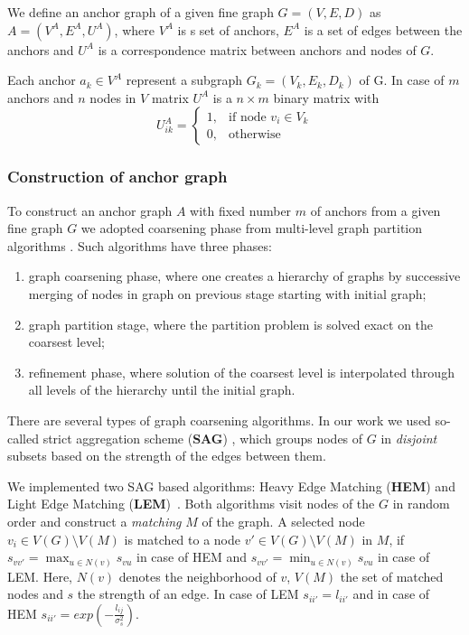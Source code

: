 \documentclass[
	fontsize=12pt,
	paper=a4,
	twoside=false,
	numbers=noenddot,
	plainheadsepline,
	toc=listof,
	toc=bibliography
]{scrartcl}
\begin{document}
We define an anchor graph of a given fine graph $G = (V,E,D)$ as $A = (V^A,E^A, U^A)$, where $V^A$ is s set of anchors, $E^{A}$ is a set of edges between the anchors and $U^{A}$ is a correspondence matrix between anchors and nodes of $G$.

Each anchor $a_k\in V^A$ represent a subgraph $G_k = (V_k,E_k, D_k)$ of G. In case of $m$ anchors and $n$ nodes in $V$  matrix $U^{A}$ is a $n\times m$ binary matrix with 
$$U^{A}_{ik} = \begin{cases} 1, & \mbox{if node } v_i\in V_k    \\
	                         0, & \mbox{otherwise} \end{cases} $$	 
	                                                 
\subsubsection{Construction of anchor graph}	                         
To construct an anchor graph $A$ with fixed number $m$ of anchors from a given fine graph $G$ we adopted coarsening phase from multi-level graph partition algorithms \cite{Chevalier09_GP, Safro2012_GC, Karypis95_GP, Hendrickson1995}.
Such algorithms have three phases: 
\begin{enumerate}
	\item graph coarsening phase, where one creates a hierarchy of graphs by successive merging of nodes in graph on previous stage starting with initial graph;
	\item graph partition stage, where the partition problem is solved exact on the coarsest level;
	\item refinement phase, where solution of the coarsest level is interpolated through all levels of the hierarchy until the initial graph.
\end{enumerate}
There are several types of graph coarsening algorithms. In our work we used so-called strict aggregation scheme (\textbf{SAG}) \cite{Chevalier09_GP}, which groups nodes of $G$ in \emph{disjoint} subsets based on the strength of the edges between them. 

We implemented two SAG based algorithms: Heavy Edge Matching (\textbf{HEM}) and Light Edge Matching (\textbf{LEM})~\cite{Chevalier09_GP}. Both algorithms visit nodes of the $G$ in random order and construct a \emph{matching} $M$ of the graph. A selected node $v_i\in V(G)\setminus V(M)$ is matched to a node $v\prime\in V(G)\setminus V(M)$ in $M$, if $s_{vv\prime} = \max_{u\in N(v)} s_{vu}$ in case of HEM and
$s_{vv\prime} = \min_{u\in N(v)} s_{vu}$ in case of LEM. Here, $N(v)$ denotes the neighborhood of $v$, $V(M)$ the set of matched nodes and $s$ the strength of an edge. In case of LEM $s_{ii\prime} = l_{ii\prime}$ and in case of HEM $s_{ii\prime} = exp(-\frac{l_{ij}}{\sigma^2_{s}})$.
\end{document}
